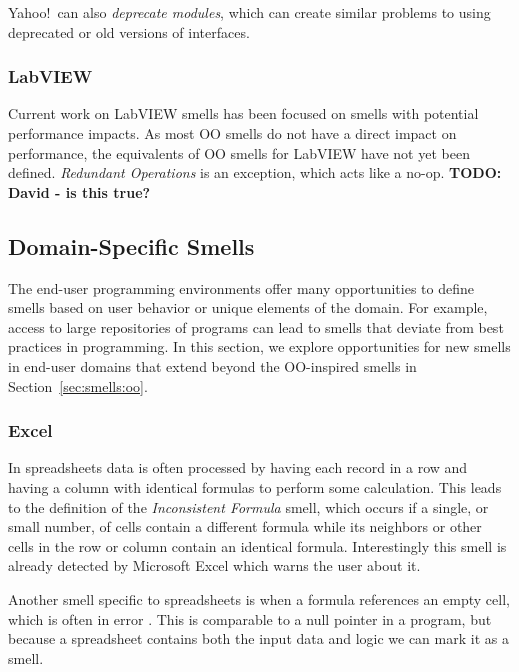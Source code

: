 \documentclass[10pt,conference,compsocconf]{IEEEtran}
\newcommand{\todo}[1]{\textbf{TODO: #1}}
\begin{document}
Yahoo!\ can also \emph{deprecate modules}, which can create similar problems to using deprecated or old versions of interfaces.

\subsubsection{LabVIEW}

Current work on LabVIEW smells has been focused on smells with potential performance impacts.
As most OO smells do not have a direct impact on performance, the equivalents of OO smells for LabVIEW have not yet been defined. \emph{Redundant Operations} is an exception, which acts like a no-op. \todo{David - is this true?}

\subsection{Domain-Specific Smells}
\label{sec:smells:domain}
The end-user programming environments offer many opportunities to define smells based on user behavior or unique elements of the domain. For example, access to large repositories of programs can lead to smells that deviate from best practices in programming. In this section, we explore opportunities for new smells in end-user domains that extend beyond the OO-inspired smells in Section~\ref{sec:smells:oo}. 

\subsubsection{Excel}

In spreadsheets data is often processed by having each record in a row and having a column with identical formulas to perform some calculation.
This leads to the definition of the \emph{Inconsistent Formula} smell, which occurs if a single, or small number, of cells contain a different formula while its neighbors or other cells in the row or column contain an identical formula.
Interestingly this smell is already detected by Microsoft Excel which warns the user about it.

Another smell specific to spreadsheets is when a formula references an empty cell, which is often in error \cite{cunha2012towards}.
This is comparable to a null pointer in a program, but because a spreadsheet contains both the input data and logic we can mark it as a smell.
\end{document}
